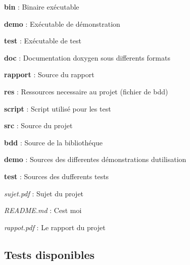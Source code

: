 \begin{DoxyItemize}
\item {\bfseries bin} \+: Binaire exécutable
\begin{DoxyItemize}
\item {\bfseries demo} \+: Exécutable de démonstration
\item {\bfseries test} \+: Exécutable de test
\end{DoxyItemize}
\item {\bfseries doc} \+: Documentation doxygen sous differents formats
\item {\bfseries rapport} \+: Source du rapport
\item {\bfseries res} \+: Ressources necessaire au projet (fichier de bdd)
\item {\bfseries script} \+: Script utilisé pour les test
\item {\bfseries src} \+: Source du projet
\begin{DoxyItemize}
\item {\bfseries bdd} \+: Source de la bibliothéque
\item {\bfseries demo} \+: Sources des differentes démonstrations d\textquotesingle{}utilisation
\item {\bfseries test} \+: Sources des dufferents tests
\end{DoxyItemize}
\item {\itshape sujet.\+pdf} \+: Sujet du projet
\item {\itshape R\+E\+A\+D\+M\+E.\+md} \+: C\textquotesingle{}est moi
\item {\itshape rappot.\+pdf} \+: Le rapport du projet
\end{DoxyItemize}

\subsection*{Tests disponibles}


\begin{DoxyItemize}
\item 
\item 
\item 
\item 
\item 
\item 
\end{DoxyItemize}